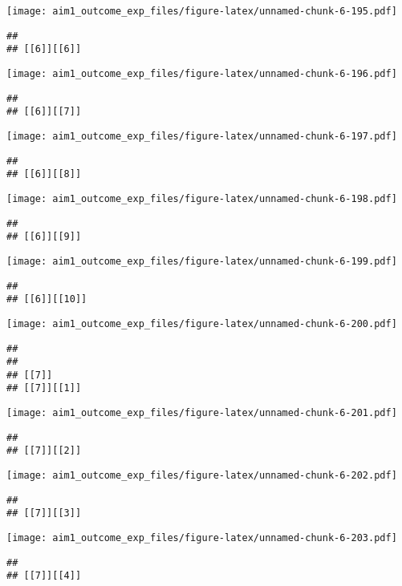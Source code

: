 \documentclass[
]{article}
\begin{document}
\texttt{[image: aim1\_outcome\_exp\_files/figure-latex/unnamed-chunk-6-195.pdf]}

\begin{verbatim}
## 
## [[6]][[6]]
\end{verbatim}

\texttt{[image: aim1\_outcome\_exp\_files/figure-latex/unnamed-chunk-6-196.pdf]}

\begin{verbatim}
## 
## [[6]][[7]]
\end{verbatim}

\texttt{[image: aim1\_outcome\_exp\_files/figure-latex/unnamed-chunk-6-197.pdf]}

\begin{verbatim}
## 
## [[6]][[8]]
\end{verbatim}

\texttt{[image: aim1\_outcome\_exp\_files/figure-latex/unnamed-chunk-6-198.pdf]}

\begin{verbatim}
## 
## [[6]][[9]]
\end{verbatim}

\texttt{[image: aim1\_outcome\_exp\_files/figure-latex/unnamed-chunk-6-199.pdf]}

\begin{verbatim}
## 
## [[6]][[10]]
\end{verbatim}

\texttt{[image: aim1\_outcome\_exp\_files/figure-latex/unnamed-chunk-6-200.pdf]}

\begin{verbatim}
## 
## 
## [[7]]
## [[7]][[1]]
\end{verbatim}

\texttt{[image: aim1\_outcome\_exp\_files/figure-latex/unnamed-chunk-6-201.pdf]}

\begin{verbatim}
## 
## [[7]][[2]]
\end{verbatim}

\texttt{[image: aim1\_outcome\_exp\_files/figure-latex/unnamed-chunk-6-202.pdf]}

\begin{verbatim}
## 
## [[7]][[3]]
\end{verbatim}

\texttt{[image: aim1\_outcome\_exp\_files/figure-latex/unnamed-chunk-6-203.pdf]}

\begin{verbatim}
## 
## [[7]][[4]]
\end{verbatim}
\end{document}
